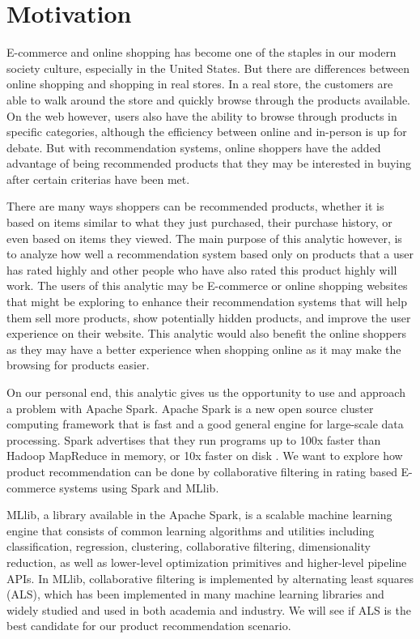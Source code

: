 \documentclass[conference]{IEEEtran}
\begin{document}
\section{Motivation}

E-commerce and online shopping has become one of the staples in our modern society culture, especially in the United States.  But there are differences between online shopping and shopping in real stores.  In a real store, the customers are able to walk around the store and quickly browse through the products available.  On the web however, users also have the ability to browse through products in specific categories, although the efficiency between online and in-person is up for debate.  But with recommendation systems, online shoppers have the added advantage of being recommended products that they may be interested in buying after certain criterias have been met.

There are many ways shoppers can be recommended products, whether it is based on items similar to what they just purchased, their purchase history, or even based on items they viewed.  The main purpose of this analytic however, is to analyze how well a recommendation system based only on products that a user has rated highly and other people who have also rated this product highly will work.  The users of this analytic may be E-commerce or online shopping websites that might be exploring to enhance their recommendation systems that will help them sell more products, show potentially hidden products, and improve the user experience on their website.  This analytic would also benefit the online shoppers as they may have a better experience when shopping online as it may make the browsing for products easier.

On our personal end, this analytic gives us the opportunity to use and approach a problem with Apache Spark.  Apache Spark is a new open source cluster computing framework that is fast and a good general engine for large-scale data processing. Spark advertises that they run programs up to 100x faster than Hadoop MapReduce in memory, or 10x faster on disk \cite{ApacheSpark}. We want to explore how product recommendation can be done by collaborative filtering in rating based E-commerce systems using Spark and MLlib.

MLlib, a library available in the Apache Spark,  is a scalable machine learning engine that consists of common learning algorithms and utilities including classification, regression, clustering, collaborative filtering, dimensionality reduction, as well as lower-level optimization primitives and higher-level pipeline APIs. In MLlib, collaborative filtering is implemented by alternating least squares (ALS), which has been implemented in many machine learning libraries and widely studied and used in both academia and industry. We will see if ALS is the best candidate for our product recommendation scenario. 
\end{document}
